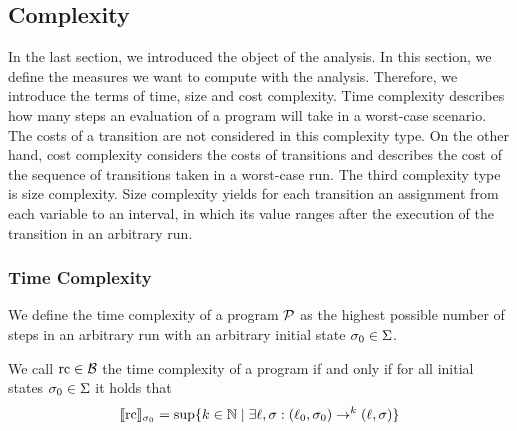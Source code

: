 \subsection{Complexity}

In the last section, we introduced the object of the analysis.
In this section, we define the measures we want to compute with the analysis.
Therefore, we introduce the terms of time, size and cost complexity.
Time complexity describes how many steps an evaluation of a program will take in a worst-case scenario.
The costs of a transition are not considered in this complexity type.
On the other hand, cost complexity considers the costs of transitions and describes the cost of the sequence of transitions taken in a worst-case run.
The third complexity type is size complexity.
Size complexity yields for each transition an assignment from each variable to an interval, in which its value ranges after the execution of the transition in an arbitrary run.

\subsubsection{Time Complexity}

We define the time complexity of a program $\mathcal{P}$ as the highest possible number of steps in an arbitrary run with an arbitrary initial state $\sigma_0 \in \Sigma$.

\begin{definition}
  We call $\text{rc} \in \mathcal{B}$ the time complexity of a program if and only if for all initial states $\sigma_0 \in \Sigma$ it holds that
  \[ \llbracket \text{rc} \rrbracket_{\sigma_0} = \sup \lbrace  k \in \mathbb{N} \mid \exists \ell, \sigma: (\ell_0, \sigma_0) \rightarrow^k (\ell, \sigma)  \rbrace \]
\end{definition}


